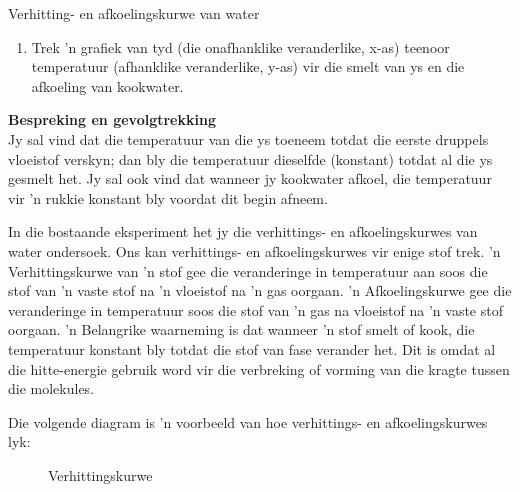 \begin{f_experiment}{Verhitting- en afkoelingskurwe van water}
{\begin{enumerate}[noitemsep, label=\textbf{\arabic*}.]
\begin{table}[H]
\begin{center}
\begin{tabular}{|l|l|l|l|}
    \end{tabular}
      \end{center}
\end{table}
\item Trek 'n grafiek van tyd (die onafhanklike veranderlike, x-as) teenoor temperatuur (afhanklike veranderlike, y-as) vir die smelt van ys en die afkoeling van kookwater.
\end{enumerate}
\par   
\label{m38736*eip-864}\noindent{}\textbf{Bespreking en gevolgtrekking}\\
Jy sal vind dat die temperatuur van die ys toeneem totdat die eerste druppels vloeistof
verskyn; dan bly die temperatuur dieselfde (konstant) totdat al die ys gesmelt het. Jy sal ook
vind dat wanneer jy kookwater afkoel, die temperatuur vir 'n rukkie konstant bly voordat dit
begin afneem.}
\end{f_experiment} 
\par \label{m38736*eip-25}In die bostaande eksperiment het jy die verhittings- en afkoelingskurwes van water ondersoek. Ons kan
verhittings- en afkoelingskurwes vir enige stof trek. 'n Verhittingskurwe van 'n stof gee die veranderinge
in temperatuur aan soos die stof van 'n vaste stof na 'n vloeistof na 'n gas oorgaan. 'n Afkoelingskurwe gee
die veranderinge in temperatuur soos die stof van  'n gas na vloeistof na 'n vaste stof oorgaan. 'n Belangrike
waarneming is dat wanneer 'n stof smelt of kook, die temperatuur konstant bly totdat die stof van fase verander
het. Dit is omdat al die hitte-energie gebruik word vir die verbreking of vorming van die kragte tussen die molekules.  \par 
Die volgende diagram is 'n voorbeeld van hoe verhittings- en afkoelingskurwes lyk: \par
\begin{minipage}{0.5\textwidth}
\begin{figure}[H]
 \begin{center}
\end{center}
\caption{Verhittingskurwe}
\end{figure}
\end{minipage}
